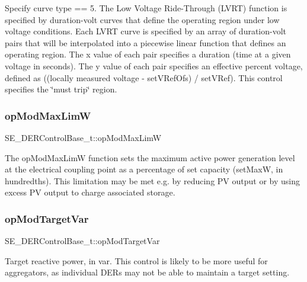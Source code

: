 Specify curve type == 5. The Low Voltage Ride-\/\+Through (L\+V\+RT) function is specified by duration-\/volt curves that define the operating region under low voltage conditions. Each L\+V\+RT curve is specified by an array of duration-\/volt pairs that will be interpolated into a piecewise linear function that defines an operating region. The x value of each pair specifies a duration (time at a given voltage in seconds). The y value of each pair specifies an effective percent voltage, defined as ((locally measured voltage -\/ set\+V\+Ref\+Ofs) / set\+V\+Ref). This control specifies the \char`\"{}must trip\char`\"{} region. \mbox{\label{group__DERControlBase_ga926fba7f7db0a007f7a5dbfeca61840a}} 
\subsubsection{\texorpdfstring{op\+Mod\+Max\+LimW}{opModMaxLimW}}
{\footnotesize\ttfamily S\+E\+\_\+\+D\+E\+R\+Control\+Base\+\_\+t\+::op\+Mod\+Max\+LimW}

The op\+Mod\+Max\+LimW function sets the maximum active power generation level at the electrical coupling point as a percentage of set capacity (set\+MaxW, in hundredths). This limitation may be met e.\+g. by reducing PV output or by using excess PV output to charge associated storage. \mbox{\label{group__DERControlBase_gacb1af6bfe16eeb2f8653a1ba5e5bb8d1}} 
\subsubsection{\texorpdfstring{op\+Mod\+Target\+Var}{opModTargetVar}}
{\footnotesize\ttfamily S\+E\+\_\+\+D\+E\+R\+Control\+Base\+\_\+t\+::op\+Mod\+Target\+Var}

Target reactive power, in var. This control is likely to be more useful for aggregators, as individual D\+E\+Rs may not be able to maintain a target setting. \mbox{\label{group__DERControlBase_ga1ff79302fcc3539736e4be0799aa66f4}} 
